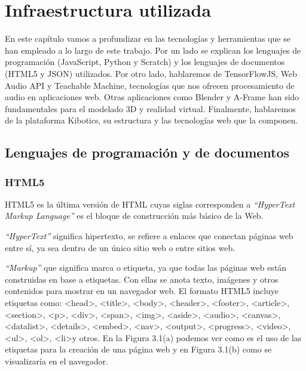 \chapter{Infraestructura utilizada}
\label{infraestructura}
En este capítulo vamos a profundizar en las tecnologías y herramientas que se han empleado a lo largo de este trabajo. Por un lado se explican los lenguajes de programación (JavaScript, Python y Scratch) y los lenguajes de documentos (HTML5 y JSON)  utilizados. Por otro lado, hablaremos de TensorFlowJS, Web Audio API y Teachable Machine, tecnologías que nos ofrecen procesamiento de audio en aplicaciones web. Otras aplicaciones como Blender y A-Frame han sido fundamentales para el  modelado 3D y realidad virtual. Finalmente, hablaremos de la plataforma Kibotics, su estructura y las tecnologías web que la componen.
\section{Lenguajes de programación y de documentos}
\subsection{HTML5}
HTML5 es la última versión de HTML cuyas siglas corresponden a \textit{``HyperText Markup Language''} es el bloque de construcción más básico de la Web\cite{html}.

\textit{``HyperText''} significa hipertexto, se refiere a enlaces que conectan páginas web entre sí, ya sea dentro de un único sitio web o entre sitios web. 

\textit{``Markup''} que significa marca o etiqueta, ya que todas las páginas web están construidas en base a etiquetas. Con ellas se anota texto, imágenes y otros contenidos para mostrar en un navegador web. El formato HTML5 incluye etiquetas como:  \textless head\textgreater, \textless title\textgreater, \textless body\textgreater, \textless header\textgreater, \textless footer\textgreater, \textless article\textgreater, \textless section\textgreater, \textless p\textgreater, \textless div\textgreater, \textless span\textgreater, \textless img\textgreater, \textless aside\textgreater, \textless audio\textgreater, \textless canvas\textgreater, \textless datalist\textgreater, \textless details\textgreater, \textless embed\textgreater, \textless nav\textgreater, \textless output\textgreater, \textless progress\textgreater, \textless video\textgreater, \textless ul\textgreater, \textless ol\textgreater, \textless li\textgreater  y otros. En la Figura 3.1(a) podemos ver como es el uso de las etiquetas para la creación de una página web y en Figura 3.1(b) como se visualizaría en el navegador.

